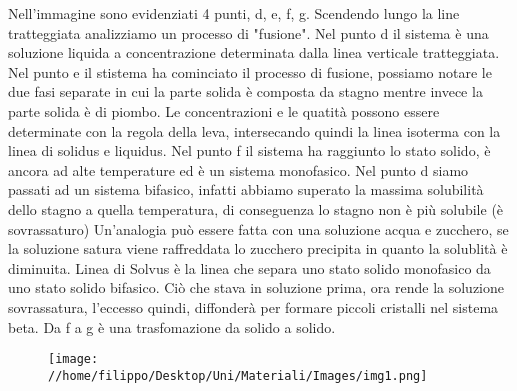 \documentclass{article}%
\begin{document}
%
Nell'immagine sono evidenziati 4 punti, d, e, f, g.\newline%
%
Scendendo lungo la line tratteggiata analizziamo un processo di "fusione".\newline%
%
Nel punto d il sistema è una soluzione liquida a concentrazione determinata dalla linea verticale tratteggiata.\newline%
%
Nel punto e il stistema ha cominciato il processo di fusione, possiamo notare le due fasi separate in cui la parte solida è composta da stagno mentre invece la parte solida è di piombo. Le concentrazioni e le quatità possono essere determinate con la regola della leva, intersecando quindi la linea isoterma con la linea di solidus e liquidus.\newline%
%
Nel punto f il sistema ha raggiunto lo stato solido, è ancora ad alte temperature ed è un sistema monofasico.\newline%
%
Nel punto d siamo passati ad un sistema bifasico, infatti abbiamo superato la massima solubilità dello stagno a quella temperatura, di conseguenza lo stagno non è più solubile (è sovrassaturo)\newline%
%
Un'analogia può essere fatta con una soluzione acqua e zucchero, se la soluzione satura viene raffreddata lo zucchero precipita in quanto la solublità è diminuita.\newline%
%
Linea di Solvus è la linea che separa uno stato solido monofasico da uno stato solido bifasico.\newline%
%
Ciò che stava in soluzione prima, ora rende la soluzione sovrassatura, l'eccesso quindi, diffonderà per formare piccoli cristalli nel sistema beta.\newline%
%
Da f a g è una trasfomazione da solido a solido.\newline%
%
\newline%
%


\begin{figure}[H]%
\centering%
\texttt{[image: //home/filippo/Desktop/Uni/Materiali/Images/img1.png]}%
\end{figure}
\end{document}
